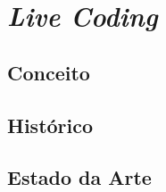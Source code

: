 \chapter{\textit{Live Coding}}
	\label{ch:livecoding}

\section{Conceito}
\section{Histórico}
\section{Estado da Arte}
